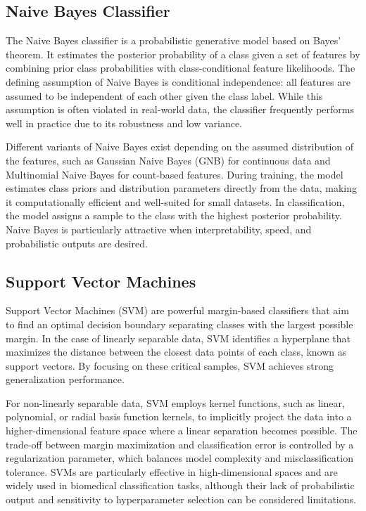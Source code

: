 \documentclass[en]{dimscthesis}
\begin{document}
\subsection{Naive Bayes Classifier} \label{nvb}

The Naive Bayes classifier \cite{bib:naive_bayes} is a probabilistic generative model based on Bayes’ theorem. It estimates the posterior probability of a class given a set of features by combining prior class probabilities with class-conditional feature likelihoods. The defining assumption of Naive Bayes is conditional independence: all features are assumed to be independent of each other given the class label. While this assumption is often violated in real-world data, the classifier frequently performs well in practice due to its robustness and low variance.

Different variants of Naive Bayes exist depending on the assumed distribution of the features, such as Gaussian Naive Bayes (GNB) for continuous data and Multinomial Naive Bayes for count-based features. During training, the model estimates class priors and distribution parameters directly from the data, making it computationally efficient and well-suited for small datasets. In classification, the model assigns a sample to the class with the highest posterior probability. Naive Bayes is particularly attractive when interpretability, speed, and probabilistic outputs are desired.

\subsection{Support Vector Machines} \label{svms}

Support Vector Machines (SVM) \cite{bib:svm} are powerful margin-based classifiers that aim to find an optimal decision boundary separating classes with the largest possible margin. In the case of linearly separable data, SVM identifies a hyperplane that maximizes the distance between the closest data points of each class, known as support vectors. By focusing on these critical samples, SVM achieves strong generalization performance.

For non-linearly separable data, SVM employs kernel functions, such as linear, polynomial, or radial basis function kernels, to implicitly project the data into a higher-dimensional feature space where a linear separation becomes possible. The trade-off between margin maximization and classification error is controlled by a regularization parameter, which balances model complexity and misclassification tolerance. SVMs are particularly effective in high-dimensional spaces and are widely used in biomedical classification tasks, although their lack of probabilistic output and sensitivity to hyperparameter selection can be considered limitations.
\end{document}
